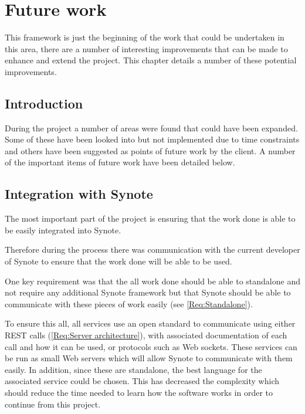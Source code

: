 \chapter{Future work} \label{Chapter: Future Work}

\begin{preamble}
This framework is just the beginning of the work that could be undertaken in this area, there are a number of interesting improvements that can be made to enhance and extend the project. This chapter details a number of these potential improvements.
\end{preamble}

\section{Introduction}

During the project a number of areas were found that could have been expanded. Some of these have been looked into but not implemented due to time constraints and others have been suggested as points of future work by the client. A number of the important items of future work have been detailed below.

\section{Integration with Synote}

The most important part of the project is ensuring that the work done is able to be easily integrated into Synote.

Therefore during the process there was communication with the current developer of Synote to ensure that the work done will be able to be used.

One key requirement was that the all work done should be able to standalone and not require any additional Synote framework but that Synote should be able to communicate with these pieces of work easily (see \cref{Req:Standalone}).

To ensure this all, all services use an open standard to communicate using either \gls{REST} calls (\cref{Req:Server architecture}), with associated documentation of each call and how it can be used, or protocols such as Web sockets. These services can be run as small Web servers which will allow Synote to communicate with them easily. In addition, since these are standalone, the best language for the associated service could be chosen. This has decreased the complexity which should reduce the time needed to learn how the software works in order to continue from this project.


